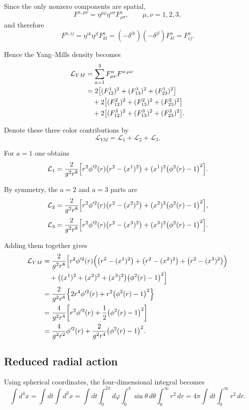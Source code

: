 \documentclass[12pt, a4paper]{article}
\begin{document}
Since the only nonzero components are spatial,
\[
F^{a,\mu\nu} = \eta^{\mu\rho}\eta^{\nu\sigma} F^a_{\rho\sigma},
\qquad
\mu,\nu = 1,2,3,
\]
and therefore
\[
F^{a,ij} = \eta^{ik}\eta^{jl} F^a_{kl}
= (-\delta^{ik})(-\delta^{jl}) F^a_{kl}
= F^a_{ij}.
\]

Hence the Yang--Mills density becomes
\[
\begin{aligned}
\mathcal{L}_{YM}
&=
\sum_{a=1}^{3} F^a_{\mu\nu} F^{a,\mu\nu} \\
&=
2\qty[(F_{12}^1)^2 + (F_{13}^1)^2 + (F_{23}^1)^2] \\
&\quad
+ 2\qty[(F_{12}^2)^2 + (F_{13}^2)^2 + (F_{23}^2)^2] \\
&\quad
+ 2\qty[(F_{12}^3)^2 + (F_{13}^3)^2 + (F_{23}^3)^2].
\end{aligned}
\]

Denote these three color contributions by
\[
\mathcal{L}_{YM} = \mathcal{L}_1 + \mathcal{L}_2 + \mathcal{L}_3.
\]

For $a=1$ one obtains
\[
\mathcal{L}_1
=
\frac{2}{g^2 r^8}
\qty[
r^2 \phi'^2(r)\qty(r^2-(x^1)^2)
+ (x^1)^2\qty(\phi^2(r)-1)^2
].
\]

By symmetry, the $a=2$ and $a=3$ parts are
\[
\mathcal{L}_2
=
\frac{2}{g^2 r^8}
\qty[
r^2 \phi'^2(r)\qty(r^2-(x^2)^2)
+ (x^2)^2\qty(\phi^2(r)-1)^2
],
\]
\[
\mathcal{L}_3
=
\frac{2}{g^2 r^8}
\qty[
r^2 \phi'^2(r)\qty(r^2-(x^3)^2)
+ (x^3)^2\qty(\phi^2(r)-1)^2
].
\]

Adding them together gives
\[
\begin{aligned}
\mathcal{L}_{YM}
&=
\frac{2}{g^2 r^8}\Bigl[
r^2 \phi'^2(r)\Bigl(
\qty(r^2-(x^1)^2)
+ \qty(r^2-(x^2)^2)
+ \qty(r^2-(x^3)^2)
\Bigr) \\
&\quad
+ \qty((x^1)^2 + (x^2)^2 + (x^3)^2)\qty(\phi^2(r)-1)^2
\Bigr] \\
&=
\frac{2}{g^2 r^8}
\qty{
2 r^4 \phi'^2(r) + r^2 \qty(\phi^2(r)-1)^2
} \\
&=
\frac{4}{g^2 r^4}
\qty[
r^2 \phi'^2(r) + \frac{1}{2}\qty(\phi^2(r)-1)^2
] \\
&=
\frac{4}{g^2 r^2}\phi'^2(r)
+ \frac{2}{g^2 r^4}\qty(\phi^2(r)-1)^2.
\end{aligned}
\]

\subsection*{Reduced radial action}

Using spherical coordinates, the four-dimensional integral becomes
\[
\int d^4 x
=
\int dt \int d^3 x
=
\int dt \int_0^{2\pi} d\varphi \int_0^\pi \sin\theta\,d\theta \int_0^\infty r^2\,dr
=
4\pi \int dt \int_0^\infty r^2\,dr.
\]
\end{document}
